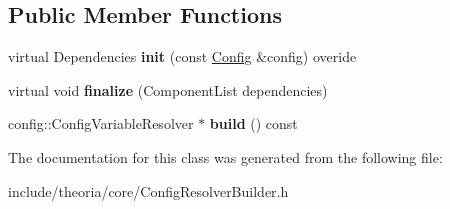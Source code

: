 \subsection*{Public Member Functions}
\begin{DoxyCompactItemize}
\item 
\hypertarget{classConfigResolverBuilder_a63ae6487bfd38e5a13de3a369d1509ec}{virtual Dependencies {\bfseries init} (const \hyperlink{classtheoria_1_1config_1_1Config}{Config} \&config) overide}\label{classConfigResolverBuilder_a63ae6487bfd38e5a13de3a369d1509ec}

\item 
\hypertarget{classConfigResolverBuilder_a591ec176049f29c3a51fbad2501f1ab0}{virtual void {\bfseries finalize} (Component\+List dependencies)}\label{classConfigResolverBuilder_a591ec176049f29c3a51fbad2501f1ab0}

\item 
\hypertarget{classConfigResolverBuilder_ad5aabf95021d511db85df142e847fd2e}{config\+::\+Config\+Variable\+Resolver $\ast$ {\bfseries build} () const }\label{classConfigResolverBuilder_ad5aabf95021d511db85df142e847fd2e}

\end{DoxyCompactItemize}


The documentation for this class was generated from the following file\+:\begin{DoxyCompactItemize}
\item 
include/theoria/core/Config\+Resolver\+Builder.\+h\end{DoxyCompactItemize}
